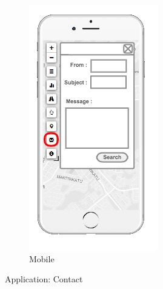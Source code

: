 \begin{figure}[ht]
\begin{subfigure}[b]{0.2\textwidth}
    \includegraphics[width=\textwidth]
      {img/c02-application/png/mobile-basemap-contact.png}
    \caption{Mobile}
  \end{subfigure}
  \caption{Application: Contact}
\end{figure}



